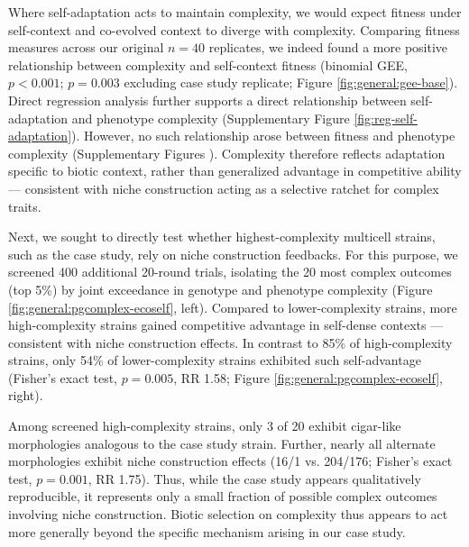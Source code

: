 Where self-adaptation acts to maintain complexity, we would expect fitness under self-context and co-evolved context to diverge with complexity.
Comparing fitness measures across our original $n=40$ replicates, we indeed found a more positive relationship between complexity and self-context fitness (binomial GEE, $p < 0.001$; $p = 0.003$ excluding case study replicate; Figure \ref{fig:general:gee-base}).
Direct regression analysis further supports a direct relationship between self-adaptation and phenotype complexity (Supplementary Figure \ref{fig:reg-self-adaptation}).
However, no such relationship arose between fitness and phenotype complexity (Supplementary Figures ).
Complexity therefore reflects adaptation specific to biotic context, rather than generalized advantage in competitive ability --- consistent with niche construction acting as a selective ratchet for complex traits.

Next, we sought to directly test whether highest-complexity multicell strains, such as the case study, rely on niche construction feedbacks.
For this purpose, we screened 400 additional 20-round trials, isolating the 20 most complex outcomes (top 5\%) by joint exceedance in genotype and phenotype complexity (Figure \ref{fig:general:pgcomplex-ecoself}, left).
Compared to lower-complexity strains, more high-complexity strains gained competitive advantage in self-dense contexts --- consistent with niche construction effects.
In contrast to 85\% of high-complexity strains, only 54\% of lower-complexity strains exhibited such self-advantage (Fisher's exact test, $p = 0.005$, RR 1.58; Figure \ref{fig:general:pgcomplex-ecoself}, right).

Among screened high-complexity strains, only 3 of 20 exhibit cigar-like morphologies analogous to the case study strain.
Further, nearly all alternate morphologies exhibit niche construction effects (16/1 vs. 204/176; Fisher's exact test, $p = 0.001$, RR 1.75).
Thus, while the case study appears qualitatively reproducible, it represents only a small fraction of possible complex outcomes involving niche construction.
Biotic selection on complexity thus appears to act more generally beyond the specific mechanism arising in our case study.

